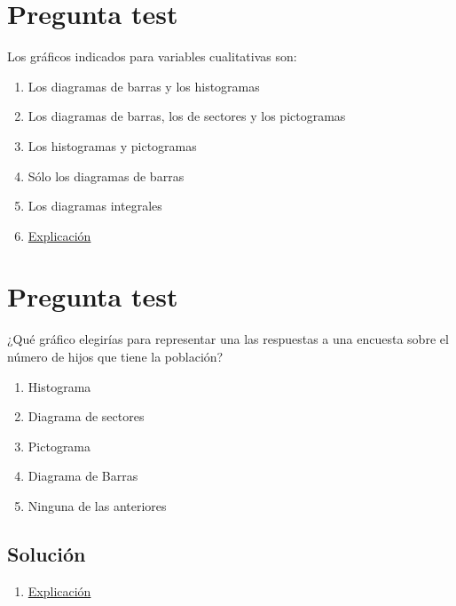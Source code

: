 \documentclass[
]{book}
\providecommand{\tightlist}{%
  \setlength{\itemsep}{0pt}\setlength{\parskip}{0pt}}
\begin{document}
\hypertarget{pregunta-test-24}{%
\section{Pregunta test}\label{pregunta-test-24}}

Los gráficos indicados para variables cualitativas son:

\begin{enumerate}
\def\labelenumi{\alph{enumi})}
\item
  Los diagramas de barras y los histogramas
\item
  Los diagramas de barras, los de sectores y los pictogramas
\item
  Los histogramas y pictogramas
\item
  Sólo los diagramas de barras
\item
  Los diagramas integrales
\item
  \href{https://1fjmanzano.github.io/bioestadistica/diagramas-de-barras-y-sectores.html}{Explicación}
\end{enumerate}

\hypertarget{pregunta-test-25}{%
\section{Pregunta test}\label{pregunta-test-25}}

¿Qué gráfico elegirías para representar una las respuestas a una encuesta sobre el número de hijos que tiene la población?

\begin{enumerate}
\def\labelenumi{\alph{enumi})}
\tightlist
\item
  Histograma
\item
  Diagrama de sectores
\item
  Pictograma
\item
  Diagrama de Barras
\item
  Ninguna de las anteriores
\end{enumerate}

\hypertarget{soluciuxf3n-27}{%
\subsection{Solución}\label{soluciuxf3n-27}}

\begin{enumerate}
\def\labelenumi{\alph{enumi})}
\setcounter{enumi}{3}
\tightlist
\item
  \href{https://1fjmanzano.github.io/bioestadistica/diagramas-de-barras-y-sectores.html}{Explicación}
\end{enumerate}
\end{document}
